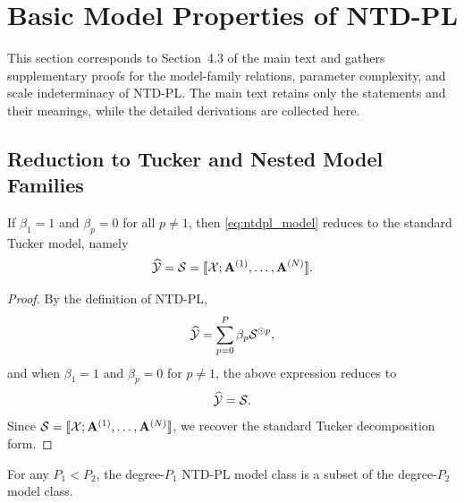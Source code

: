 

\section{Basic Model Properties of NTD-PL}
\label{app:model_properties}

This section corresponds to Section~4.3 of the main text and gathers supplementary proofs for the model-family relations, parameter complexity, and scale indeterminacy of NTD-PL. The main text retains only the statements and their meanings, while the detailed derivations are collected here.

\subsection{Reduction to Tucker and Nested Model Families}

\begin{proposition}
\label{prop:tucker_special_case_app}
If $\beta_1=1$ and $\beta_p=0$ for all $p\neq 1$, then \eqref{eq:ntdpl_model} reduces to the standard Tucker model, namely
\begin{equation}
\widehat{\mathcal{Y}}
=
\mathcal{S}
=
\llbracket \mathcal{X};\mathbf A^{(1)},\dots,\mathbf A^{(N)}\rrbracket.
\end{equation}
\end{proposition}

\begin{proof}
By the definition of NTD-PL,
\begin{equation}
\widehat{\mathcal{Y}}
=
\sum_{p=0}^{P}\beta_p \mathcal{S}^{\odot p},
\end{equation}
and when $\beta_1=1$ and $\beta_p=0$ for $p\neq 1$, the above expression reduces to
\begin{equation}
\widehat{\mathcal{Y}}
=
\mathcal{S}.
\end{equation}
Since $\mathcal{S}=\llbracket \mathcal{X};\mathbf A^{(1)},\dots,\mathbf A^{(N)}\rrbracket$, we recover the standard Tucker decomposition form.
\end{proof}

\begin{proposition}
\label{prop:nested_model_family_app}
For any $P_1<P_2$, the degree-$P_1$ NTD-PL model class is a subset of the degree-$P_2$ model class.
\end{proposition}

